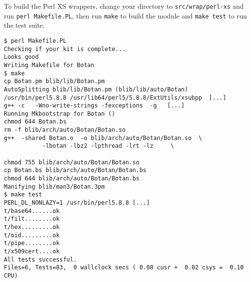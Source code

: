 \documentclass{article}
\newcommand{\filename}[1]{\texttt{#1}}
\begin{document}
To build the Perl XS wrappers, change your directory to
\filename{src/wrap/perl-xs} and run \verb|perl Makefile.PL|, then run
\verb|make| to build the module and \verb|make test| to run the test
suite.

\begin{verbatim}
$ perl Makefile.PL
Checking if your kit is complete...
Looks good
Writing Makefile for Botan
$ make
cp Botan.pm blib/lib/Botan.pm
AutoSplitting blib/lib/Botan.pm (blib/lib/auto/Botan)
/usr/bin/perl5.8.8 /usr/lib64/perl5/5.8.8/ExtUtils/xsubpp  [...]
g++ -c   -Wno-write-strings -fexceptions  -g   [...]
Running Mkbootstrap for Botan ()
chmod 644 Botan.bs
rm -f blib/arch/auto/Botan/Botan.so
g++  -shared Botan.o  -o blib/arch/auto/Botan/Botan.so  \
           -lbotan -lbz2 -lpthread -lrt -lz     \

chmod 755 blib/arch/auto/Botan/Botan.so
cp Botan.bs blib/arch/auto/Botan/Botan.bs
chmod 644 blib/arch/auto/Botan/Botan.bs
Manifying blib/man3/Botan.3pm
$ make test
PERL_DL_NONLAZY=1 /usr/bin/perl5.8.8 [...]
t/base64......ok
t/filt........ok
t/hex.........ok
t/oid.........ok
t/pipe........ok
t/x509cert....ok
All tests successful.
Files=6, Tests=83,  0 wallclock secs ( 0.08 cusr +  0.02 csys =  0.10 CPU)
\end{verbatim}
\end{document}
